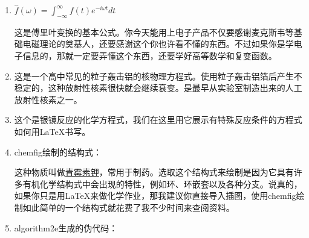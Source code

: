 \begin{enumerate}

\item $ \hat{f}(\omega)=\int^{\infty}_{-\infty}f(t)e^{-i\omega t}dt $

这是傅里叶变换的基本公式。你今天能用上电子产品不仅要感谢麦克斯韦等基础电磁理论的奠基人，还要感谢这个你也许看不懂的东西。不过如果你是学电子信息的，那就一定要弄懂这个东西，还要学好高等数学和复变函数。

\item {}

这是一个高中常见的\textalpha 粒子轰击铝的核物理方程式。使用\textalpha 粒子轰击铝箔后产生不稳定的，这种放射性核素很快就会继续衰变。是最早从实验室制造出来的人工放射性核素之一。

\item {}

这个是银镜反应的化学方程式，我们在这里用它展示有特殊反应条件的方程式如何用\LaTeX 书写。

\item chemfig绘制的结构式：

 

这种物质叫做\href{https://www.chem960.com/cas/113984/}{青霉素钾}，常用于制药。选取这个结构式来绘制是因为它具有许多有机化学结构式中会出现的特性，例如环、环嵌套以及各种分支。说真的，如果你只是用\LaTeX 来做化学作业，那我建议你直接导入插图，使用chemfig绘制如此简单的一个结构式就花费了我不少时间来查阅资料。

\item algorithm2e生成的伪代码：

\begin{algorithm}[H]
	
	
	
	\SetAlgoNoLine
	
\end{algorithm}


\end{enumerate}
